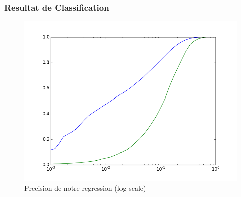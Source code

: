 \documentclass{beamer}
\begin{document}
\begin{frame}
\frametitle{Resultat de Classification}

\begin{figure}[htp]
\centering
\includegraphics[scale=0.4]{fig/log_eps_curve.png}
\caption{Precision de notre regression (log scale)}
\end{figure}

\end{frame}


\end{document}

